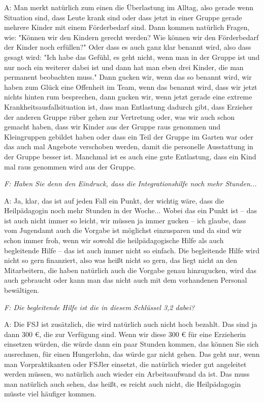 \begin{linenumbers*}
A: Man merkt natürlich zum einen die Überlastung im Alltag, also gerade wenn Situation sind, dass Leute krank sind oder dass jetzt in einer Gruppe gerade mehrere Kinder mit einem Förderbedarf sind. Dann kommen natürlich Fragen, wie: "Können wir den Kindern gerecht werden? Wie können wir den Förderbedarf der Kinder noch erfüllen?" Oder dass es auch ganz klar benannt wird, also dass gesagt wird: "Ich habe das Gefühl, es geht nicht, wenn man in der Gruppe ist und nur noch ein weiterer dabei ist und dann hat man eben drei Kinder, die man permanent beobachten muss." Dann gucken wir, wenn das so benannt wird, wir haben zum Glück eine Offenheit im Team, wenn das benannt wird, dass wir jetzt nichts hinten rum besprechen, dann gucken wir, wenn jetzt gerade eine extreme Krankheitsausfallsituation ist, dass man Entlastung dadurch gibt, dass Erzieher der anderen Gruppe rüber gehen zur Vertretung oder, was wir auch schon gemacht haben, dass wir Kinder aus der Gruppe raus genommen und Kleingruppen gebildet haben oder dass ein Teil der Gruppe im Garten war oder das auch mal Angebote verschoben werden, damit die personelle Ausstattung in der Gruppe besser ist. Manchmal ist es auch eine gute Entlastung, dass ein Kind mal raus genommen wird aus der Gruppe. 

\emph{F: Haben Sie denn den Eindruck, dass die Integrationshilfe noch mehr Stunden...}

A: Ja, klar, das ist auf jeden Fall ein Punkt, der wichtig wäre, dass die Heilpädagogin noch mehr Stunden in der Woche... Wobei das ein Punkt ist -- das ist auch nicht immer so leicht, wir müssen ja immer gucken -- ich glaube, dass vom Jugendamt auch die Vorgabe ist möglichst einzusparen und da sind wir schon immer froh, wenn wir sowohl die heilpädagogische Hilfe als auch begleitende Hilfe -- das ist auch immer nicht so einfach. Die begleitende Hilfe wird nicht so gern finanziert, also was heißt nicht so gern, das liegt nicht an den Mitarbeitern, die haben natürlich auch die Vorgabe genau hinzugucken, wird das auch gebraucht oder kann man das nicht auch mit dem vorhandenen Personal bewältigen. 

\emph{F: Die begleitende Hilfe ist die in diesem Schlüssel 3,2 dabei?} 

A: Die FSJ ist zusätzlich, die wird natürlich auch nicht hoch bezahlt. Das sind ja dann 300 €, die zur Verfügung sind. Wenn wir diese 300 € für eine Erzieherin einsetzen würden, die würde dann ein paar Stunden kommen, das können Sie sich ausrechnen, für einen Hungerlohn, das würde gar nicht gehen. Das geht nur, wenn man Vorpraktikanten oder FSJler einsetzt, die natürlich wieder gut angeleitet werden müssen, wo natürlich auch wieder ein Arbeitsaufwand da ist. Das muss man natürlich auch sehen, das heißt, es reicht auch nicht, die Heilpädagogin müsste viel häufiger kommen.


\end{linenumbers*}
